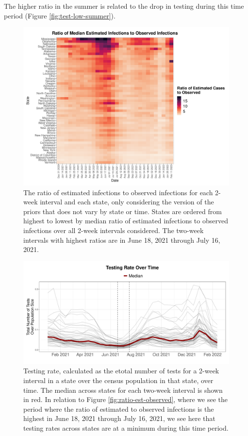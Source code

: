 \documentclass[12pt,twoside]{smiththesis}
\begin{document}
The higher ratio in the summer is related to the drop in testing during this time period (Figure \ref{fig:test-low-summer}).
\begin{figure}
\includegraphics[width=1\linewidth]{figure/heatmap_ratio_est_observed} \caption{\label{fig:ratio-est-observed} The ratio of estimated infections to observed infections for each 2-week interval and each state, only considering the version of the priors that does not vary by state or time. States are ordered from highest to lowest by median ratio of estimated infections to observed infections over all 2-week intervals considered. The two-week intervals with highest ratios are in June 18, 2021 through July 16, 2021.}\label{fig:unnamed-chunk-70}
\end{figure}
\begin{figure}
\includegraphics[width=0.8\linewidth]{figure/testrate-low-summer} \caption{\label{fig:test-low-summer}Testing rate, calculated as the etotal number of tests for a 2-week interval in a state over the census population in that state, over time. The median across states for each two-week interval is shown in red. In relation to Figure \ref{fig:ratio-est-observed}, where we see the period where the ratio of estimated to observed infections is the highest in June 18, 2021 through July 16, 2021, we see here that testing rates across states are at a minimum during this time period.}\label{fig:unnamed-chunk-71}
\end{figure}
\end{document}
